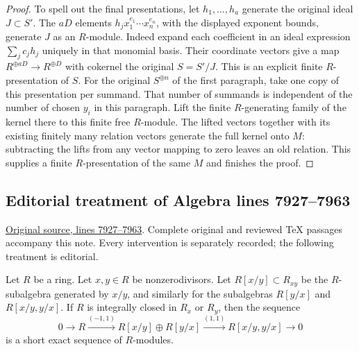 \begin{proof}
To spell out the final presentations, let $h_1,\ldots,h_a$
generate the original ideal $J\subset S'$. The $aD$ elements
$h_j x_1^{e_1}\cdots x_n^{e_n}$, with the displayed exponent
bounds, generate $J$ as an $R$-module. Indeed expand each
coefficient in an ideal expression $\sum_j c_jh_j$ uniquely
in that monomial basis. Their coordinate vectors give a map
$R^{\oplus aD}\to R^{\oplus D}$ with cokernel the original
$S=S'/J$. This is an explicit finite $R$-presentation of $S$.
For the original $S^{\oplus n}$ of the first paragraph, take
one copy of this presentation per summand. That number of summands
is independent of the number of chosen $y_i$ in this paragraph.
Lift the finite $R$-generating family
of the kernel there to this finite free $R$-module. The lifted
vectors together with its existing finitely many relation vectors
generate the full kernel onto $M$: subtracting the lifts from
any vector mapping to zero leaves an old relation. This supplies
a finite $R$-presentation of the same $M$ and finishes the proof.
\end{proof}


\subsection{Editorial treatment of Algebra lines 7927--7963}

\hypertarget{algebra-context-088}{}

\noindent\href{https://github.com/stacks/stacks-project/blob/a04446e57ec1fbc252a871afcec7752fb2807b14/algebra.tex\#L7927}{Original source, lines 7927--7963}. Complete original and reviewed TeX passages accompany this note. Every intervention is separately recorded; the following treatment is editorial.


\begin{lemma}
\label{editorial-source-lemma-silly-normal}
Let $R$ be a ring. Let $x, y \in R$ be nonzerodivisors.
Let $R[x/y] \subset R_{xy}$ be the $R$-subalgebra generated
by $x/y$, and similarly for the subalgebras $R[y/x]$ and $R[x/y, y/x]$.
If $R$ is integrally closed in $R_x$ or $R_y$, then the sequence
$$
0 \to R \xrightarrow{(-1, 1)} R[x/y] \oplus R[y/x] \xrightarrow{(1, 1)}
R[x/y, y/x] \to 0
$$
is a short exact sequence of $R$-modules.
\end{lemma}


